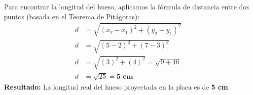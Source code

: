 \documentclass[12pt]{article}
\begin{document}
\begin{tcolorbox}
\begin{center}
    \end{center}

    \vspace{0.5cm}
    \begin{tcolorbox}[colback=medteal!10, colframe=medteal, arc=2mm, boxrule=1.2pt, title=\textbf{Desarrollo Matemático y Solución}]
        Para encontrar la longitud del hueso, aplicamos la fórmula de distancia entre dos puntos (basada en el Teorema de Pitágoras):
        \begin{align*}
            d &= \sqrt{(x_2 - x_1)^2 + (y_2 - y_1)^2} \\[1ex]
            d &= \sqrt{(5 - 2)^2 + (7 - 3)^2} \\[1ex]
            d &= \sqrt{(3)^2 + (4)^2} = \sqrt{9 + 16} \\[1ex]
            d &= \sqrt{25} = \mathbf{5 \text{ cm}}
        \end{align*}
        \textbf{Resultado:} La longitud real del hueso proyectada en la placa es de \textbf{5 cm}.
    \end{tcolorbox}
    
\end{tcolorbox}
\end{document}
